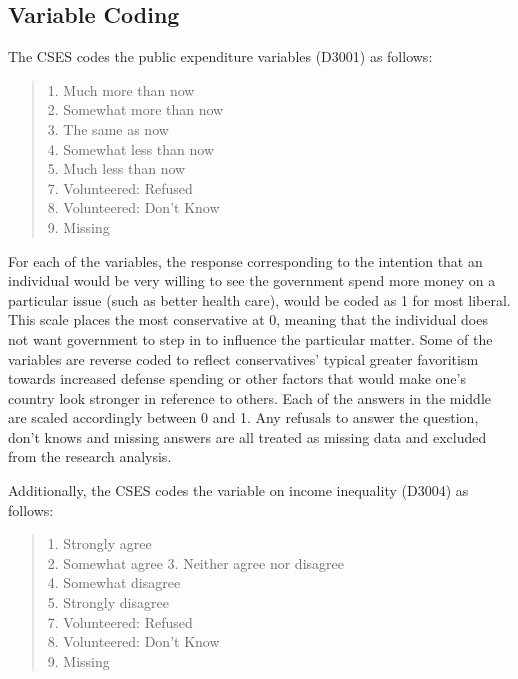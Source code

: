 \documentclass[12pt, titlepage]{article}
\begin{document}
\begin{appendices}
\subsection{Variable Coding}

The CSES codes the public expenditure variables (D3001) as follows:

\begin{quote}
	
	1. Much more than now \\ 
	2. Somewhat more than now \\
	3. The same as now \\ 
	4. Somewhat less than now \\
	5. Much less than now \\
	7. Volunteered: Refused \\
	8. Volunteered: Don't Know \\
	9. Missing

\end{quote}

For each of the variables, the response corresponding to the intention that an individual would be very willing to see the government spend more money on a particular issue (such as better health care), would be coded as 1 for most liberal. This scale places the most conservative at 0, meaning that the individual does not want government to step in to influence the particular matter. Some of the variables are reverse coded to reflect conservatives' typical greater favoritism towards increased defense spending or other factors that would make one's country look stronger in reference to others. Each of the answers in the middle are scaled accordingly between 0 and 1. Any refusals to answer the question, don't knows and missing answers are all treated as missing data and excluded from the research analysis.

Additionally, the CSES codes the variable on income inequality (D3004) as follows: 

\begin{quote}

	1. Strongly agree \\
	2. Somewhat agree 
	3. Neither agree nor disagree \\
	4. Somewhat disagree \\
	5. Strongly disagree \\ 
	7. Volunteered: Refused \\
	8. Volunteered: Don't Know \\
	9. Missing
\end{quote}	


\end{appendices}
\end{document}
